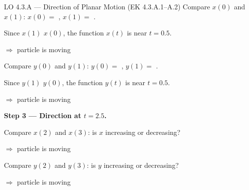 \documentclass[10pt]{article}
\begin{document}
\begin{notesbox}{LO 4.3.A --- Direction of Planar Motion (EK 4.3.A.1--A.2)}
Compare $x(0)$ and $x(1)$: $x(0) = $ \blank{1.2cm}, $x(1) = $ \blank{1.2cm}.

Since $x(1)$ \blank{1.2cm} $x(0)$, the function $x(t)$ is \blank{2cm} near $t = 0.5$.

$\Rightarrow$ particle is moving \blank{2.2cm}

Compare $y(0)$ and $y(1)$: $y(0) = $ \blank{1.2cm}, $y(1) = $ \blank{1.2cm}.

Since $y(1)$ \blank{1.2cm} $y(0)$, the function $y(t)$ is \blank{2cm} near $t = 0.5$.

$\Rightarrow$ particle is moving \blank{2.2cm}

\vspace{8pt}
\textbf{Step 3 --- Direction at $t = 2.5$.}

Compare $x(2)$ and $x(3)$: is $x$ increasing or decreasing? \blank{2.5cm}

$\Rightarrow$ particle is moving \blank{2.2cm}

Compare $y(2)$ and $y(3)$: is $y$ increasing or decreasing? \blank{2.5cm}

$\Rightarrow$ particle is moving \blank{2.2cm}

\end{notesbox}

\vspace{0.08in}
\end{document}
